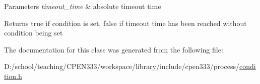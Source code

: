 \begin{DoxyParams}{Parameters}
{\em timeout\+\_\+time} & absolute timeout time \\
\hline
\end{DoxyParams}
\begin{DoxyReturn}{Returns}
{\ttfamily true} if condition is set, {\ttfamily false} if timeout time has been reached without condition being set 
\end{DoxyReturn}


The documentation for this class was generated from the following file\+:\begin{DoxyCompactItemize}
\item 
D\+:/school/teaching/\+C\+P\+E\+N333/workspace/library/include/cpen333/process/\hyperlink{process_2condition_8h}{condition.\+h}\end{DoxyCompactItemize}
